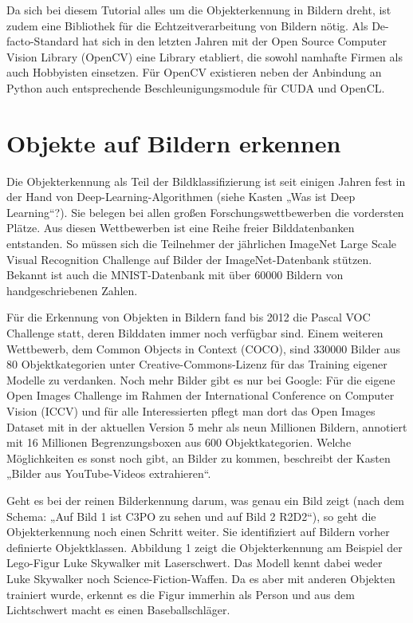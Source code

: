 Da sich bei diesem Tutorial alles um die Objekterkennung in Bildern dreht, ist zudem eine Bibliothek für die Echtzeitverarbeitung von Bildern nötig. Als De-facto-Standard hat sich in den letzten Jahren mit der Open Source Computer Vision Library (OpenCV) eine Li­brary etabliert, die sowohl namhafte Firmen als auch Hobbyisten einsetzen. Für OpenCV existieren neben der Anbindung an Python auch entsprechende Beschleunigungsmodule für CUDA und OpenCL. 



\section{Objekte auf Bildern erkennen}

Die Objekterkennung als Teil der Bildklassifizierung ist seit einigen Jahren fest in der Hand von Deep-Learning-Algorithmen (siehe Kasten „Was ist Deep Learning“?). Sie belegen bei allen großen Forschungswettbewerben die vordersten Plätze. Aus diesen Wettbewerben ist eine Reihe freier Bilddatenbanken entstanden. So müssen sich die Teilnehmer der jährlichen ImageNet Large Scale Visual Recognition Challenge auf Bilder der ImageNet-­Datenbank stützen. Bekannt ist auch die MNIST-Datenbank mit über 60000 Bildern von handgeschriebenen Zahlen. 

Für die Erkennung von Objekten in Bildern fand bis 2012 die Pascal VOC Challenge statt, deren Bilddaten immer noch verfügbar sind. Einem weiteren Wettbewerb, dem Common Objects in Context (COCO), sind 330000 Bilder aus 80 Objektkategorien unter Creative-Commons-­Lizenz für das Training eigener Modelle zu verdanken. Noch mehr Bilder gibt es nur bei Google: Für die eigene Open Images Challenge im Rahmen der International Conference on Computer Vision (ICCV) und für alle Interessierten pflegt man dort das Open Images Dataset mit in der aktuellen Version 5 mehr als neun Millionen Bildern, annotiert mit 16 Millionen Begrenzungsboxen aus 600 Objektkategorien. Welche Möglichkeiten es sonst noch gibt, an Bilder zu kommen, beschreibt der Kasten „Bilder aus YouTube-Videos extrahieren“. 

Geht es bei der reinen Bilderkennung darum, was genau ein Bild zeigt (nach dem Schema: „Auf Bild 1 ist C3PO zu sehen und auf Bild 2 R2D2“), so geht die Objekterkennung noch einen Schritt weiter. Sie identifiziert auf Bildern vorher definierte Objektklassen. Abbildung 1 zeigt die Objekterkennung am Beispiel der Lego-Figur Luke Skywalker mit Laserschwert. Das Modell kennt dabei weder Luke Sky­walker noch Science-Fiction-Waffen. Da es aber mit anderen Objekten trainiert wurde, erkennt es die Figur immerhin als Person und aus dem Lichtschwert macht es einen Baseballschläger. 

